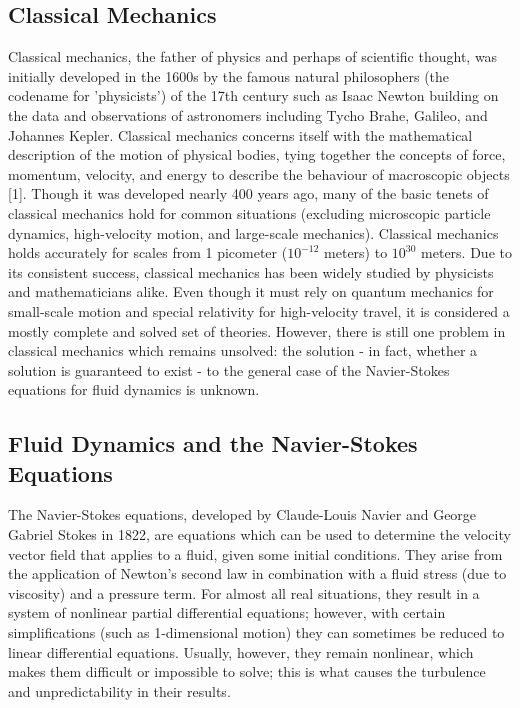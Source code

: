 \documentclass[a4paper]{article}
\begin{document}
\subsection*{Classical Mechanics}

Classical mechanics, the father of physics and perhaps of scientific thought, was initially developed in the 1600s by the famous natural philosophers (the codename for 'physicists') of the 17th century such as Isaac Newton building on the data and observations of astronomers including Tycho Brahe, Galileo, and Johannes Kepler. Classical mechanics concerns itself with the mathematical description of the motion of physical bodies, tying together the concepts of force, momentum, velocity, and energy to describe the behaviour of macroscopic objects [1]. Though it was developed nearly 400 years ago, many of the basic tenets of classical mechanics hold for common situations (excluding microscopic particle dynamics, high-velocity motion, and large-scale mechanics). Classical mechanics holds accurately for scales from 1 picometer ($10^{-12}$ meters) to $10^{30}$ meters. Due to its consistent success, classical mechanics has been widely studied by physicists and mathematicians alike. Even though it must rely on quantum mechanics for small-scale motion and special relativity for high-velocity travel, it is considered a mostly complete and solved set of theories. However, there is still one problem in classical mechanics which remains unsolved: the solution - in fact, whether a solution is guaranteed to exist - to the general case of the Navier-Stokes equations for fluid dynamics is unknown.

\subsection*{Fluid Dynamics and the Navier-Stokes Equations}

The Navier-Stokes equations, developed by Claude-Louis Navier and George Gabriel Stokes in 1822, are equations which can be used to determine the velocity vector field that applies to a fluid, given some initial conditions. They arise from the application of Newton's second law in combination with a fluid stress (due to viscosity) and a pressure term. For almost all real situations, they result in a system of nonlinear partial differential equations; however, with certain simplifications (such as 1-dimensional motion) they can sometimes be reduced to linear differential equations. Usually, however, they remain nonlinear, which makes them difficult or impossible to solve; this is what causes the turbulence and unpredictability in their results. 
\end{document}
